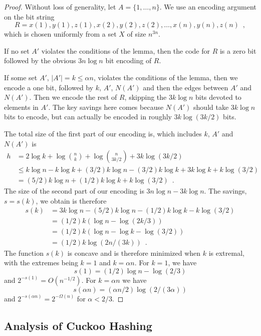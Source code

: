 \documentclass[lotsofwhite]{patmorin}
\begin{document}
\begin{proof}
Without loss of generality, let $A=\{1,\ldots,n\}$.  We use an encoding argument on the bit string
\[
   R = x(1), y(1), z(1), x(2), y(2), z(2), \ldots, x(n), y(n), z(n) \enspace ,
\]
which is chosen uniformly from a set $X$ of size $n^{3n}$.

If no set $A'$ violates the conditions of the lemma, then the code for
$R$ is a zero bit followed by the obvious $3n\log n$ bit encoding of $R$.

If some set $A'$, $|A'|=k\le \alpha n$, violates the conditions of the
lemma, then we encode a one bit, followed by $k$, $A'$, $N(A')$ and
then the edges between $A'$ and $N(A')$.  Then we encode the rest of
$R$, skipping the $3k\log n$ bits devoted to elements in $A'$.  The key
savings here comes because $N(A')$ should take $3k\log n$ bits to encode,
but can actually be encoded in roughly $3k\log(3k/2)$ bits.

The total size of the first part of our encoding is, which includes $k$,
$A'$ and $N(A')$ is
\begin{align*}
    h & = 2\log k + \log\binom{n}{k} + \log\binom{n}{3k/2} + 3k\log (3k/2) \\
       & \le k\log n - k\log k + (3/2)k\log n - (3/2)k\log k + 3k\log k + k\log(3/2) \\
      & = (5/2)k\log n + (1/2)k\log k + k\log(3/2)  \enspace .
\end{align*}
The size of the second part of our encoding is $3n\log n - 3k\log n$.  The savings, $s=s(k)$, we obtain is therefore
\begin{align*}
     s(k) & = 3k\log n - (5/2)k\log n - (1/2)k\log k - k\log(3/2) \\
       & = (1/2)k(\log n - \log(2k/3)) \\
       & = (1/2)k(\log n - \log k - \log(3/2)) \\
       & = (1/2)k\log(2n/(3k)) \enspace .
\end{align*}
The function $s(k)$ is concave and is therefore minimized when $k$
is extremal, with the extremes being $k=1$ and $k=\alpha
n$. For $k=1$, we have
\[
    s(1)=(1/2)\log n - \log(2/3)
\]
and $2^{-s(1)} = O(n^{-1/2})$.  For $k=\alpha n$ we have
\[
   s(\alpha n) = (\alpha n/2)\log(2/(3\alpha))
\]
and $2^{-s(\alpha n)} = 2^{-\Omega(n)}$ for $\alpha < 2/3$.
\end{proof}

\subsection{Analysis of Cuckoo Hashing}
\end{document}
